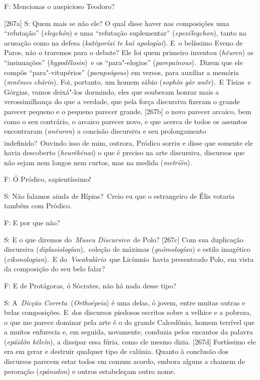  

F: Mencionas o auspicioso Teodoro?

 

[267a] S: Quem mais se não ele? O qual disse haver nas composições
uma ``refutação'' (\emph{elegchón}) e uma ``refutação suplementar''
(\emph{epexélegchon}), tanto na acusação como na defesa
(\emph{katêgoríai te kaì apologíai}). E~o belíssimo Eveno de Paros, não
o traremos para o debate? Ele foi quem primeiro inventou (\emph{hêuren})
as ``insinuações'' (\emph{hypodḗlosin})\emph{~}e os ``para"-elogios''
(\emph{parepaínous})\emph{.~}Dizem que ele compôs ``para"-vitupérios''
(\emph{parapsógous}) em versos, para auxiliar a memória (\emph{mnḗmes
chárin}). Foi, portanto, um homem sábio (\emph{sophòs gàr anḗr}).~E
Tísias~e Górgias, vamos deixá"-los dormindo, eles que souberam honrar
mais a verossimilhança do que a verdade, que pela força discursiva
fizeram o grande parecer pequeno e o pequeno parecer grande, [267b]
o novo parecer arcaico, bem como o seu contrário, o arcaico parecer
novo, e que acerca de todos os assuntos encontraram (\emph{anêuron}) a
concisão discursiva e seu prolongamento
indefinido?\textsuperscript{~}Ouvindo isso de mim, outrora, Pródico
sorriu e disse que somente ele havia descoberto (\emph{heurêkénai}) o
que é preciso na arte discursiva, discursos que não sejam nem longos nem
curtos, mas na medida (\emph{metríôn}).

 

F: Ó Pródico, sapientíssimo!

 

S: Não falamos ainda de Hípias?~Creio eu que o estrangeiro de Élis
votaria também com Pródico.

 

F: E por que não?

 

S: E o que diremos do~\emph{Museu Discursivo}~de Polo? [267c] Com
sua duplicação discursiva (\emph{diplasiologían})\emph{,~}coleção de
máximas (\emph{gnômologían}) e estilo imagético (\emph{eikonologian}).~E
do~\emph{Vocabulário}~que Licímnio~havia presenteado Polo, em vista da
composição do seu belo falar?

 

F: E de Protágoras, ó Sócrates, não há nada desse tipo?

 

S: A~\emph{Dicção Correta~}(\emph{Orthoépeia}) é uma delas, ó jovem,
entre muitas outras e belas composições. E~dos discursos piedosos
escritos sobre a velhice e a pobreza, o que me parece dominar pela arte
é o do grande Calcedônio, homem terrível que a muitos enfurecia e, em
seguida, novamente, conduzia pelos encantos da palavra (\emph{epáidôn
kêleîn}), a dissipar essa fúria, como ele mesmo dizia. [267d]
Fortíssimo ele era em gerar e destruir qualquer tipo de calúnia. Quanto
à conclusão dos discursos parecem estar todos em comum acordo, embora
alguns a chamem de peroração (\emph{epánodon}) e outros estabeleçam
outro nome.

